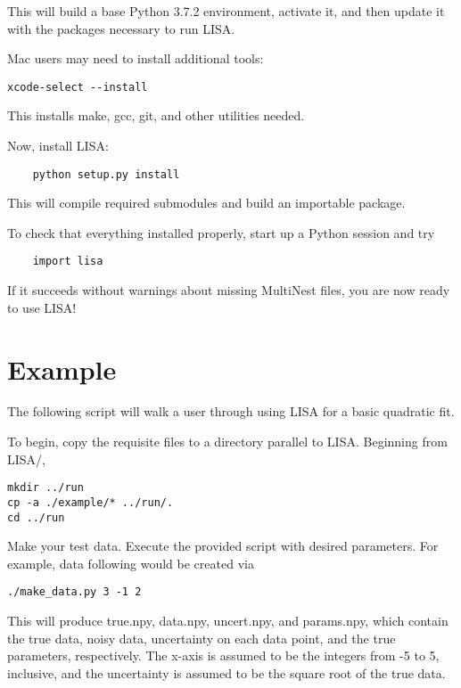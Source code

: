 \documentclass[letterpaper, 12pt]{article}
\begin{document}
\noindent This will build a base Python 3.7.2 environment, activate it, and then update 
it with the packages necessary to run LISA.\newline

\noindent Mac users may need to install additional tools:
\begin{verbatim}
xcode-select --install
\end{verbatim}
\noindent This installs make, gcc, git, and other utilities needed.\newline


\noindent Now, install LISA:
\begin{verbatim}
    python setup.py install
\end{verbatim}
\noindent This will compile required submodules and build an importable 
package.\newline

\noindent To check that everything installed properly, start up a Python 
session and try 
\begin{verbatim}
    import lisa
\end{verbatim}
\noindent If it succeeds without warnings about missing MultiNest files, 
you are now ready to use LISA!


\section{Example}
\label{sec:example}

The following script will walk a user through using LISA for a basic quadratic 
fit.

\noindent To begin, copy the requisite files to a directory parallel to LISA. 
Beginning from LISA/, 
\begin{verbatim}
mkdir ../run
cp -a ./example/* ../run/.
cd ../run
\end{verbatim}

\noindent Make your test data.  Execute the provided script with 
desired parameters.  For example, data following  
would be created via
\begin{verbatim}
./make_data.py 3 -1 2
\end{verbatim}
\noindent This will produce true.npy, data.npy, uncert.npy, and params.npy, 
which contain the true data, noisy data, uncertainty on each data point, and 
the true parameters, respectively.  The x-axis is assumed to be the integers 
from -5 to 5, inclusive, and the uncertainty is assumed to be the square root 
of the true data.\newline
\end{document}
